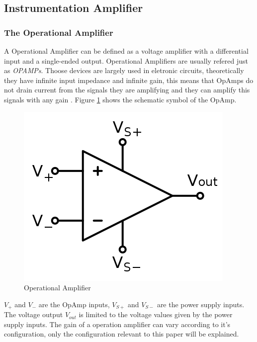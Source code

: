 \subsection{Instrumentation Amplifier}\label{ssec:instrumentation-amplifier}

	\subsubsection{The Operational Amplifier}\label{sssec:operational-amplifier}

		A Operational Amplifier can be defined as a voltage amplifier with a differential input and a single-ended output. Operational Amplifiers are usually refered just as \textit{OPAMPs}. Thoose devices are largely used in eletronic circuits, theoretically they have infinite input impedance and infinite gain, this means that OpAmps do not drain current from the signals they are amplifying and they can amplify this signals with any gain \cite{mancini2003op}. Figure \ref{fig:opamp} shows the schematic symbol of the OpAmp.

	\begin{figure}[htbp]
		\centering
			\includegraphics[scale=0.6]{figuras/fig-opamp.png}
		\caption{Operational Amplifier \cite{fig-opamp}}
		\label{fig:opamp}
	\end{figure}

	$V_{+}$ and $V_{-}$ are the OpAmp inputs, $V_{S+}$ and $V_{S-}$ are the power supply inputs. The voltage output $V_{out}$ is limited to the voltage values given by the power supply inputs. The gain of a operation amplifier can vary according to it's configuration, only the configuration relevant to this paper will be explained.

